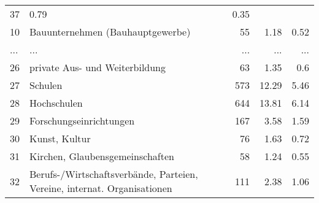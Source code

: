 \begin{longtable}{lXrrr}
          \num{37} &
          \num[round-mode=places,round-precision=2]{0,79} &
          \num[round-mode=places,round-precision=2]{0,35} \\
        10 & \multicolumn{1}{X}{Bauunternehmen (Bauhauptgewerbe)} & %
          \num{55} &
          \num[round-mode=places,round-precision=2]{1,18} &
          \num[round-mode=places,round-precision=2]{0,52} \\
       ... & ... & ... & ... & ... \\
        26 & \multicolumn{1}{X}{private Aus- und Weiterbildung} & %
          \num{63} &
          \num[round-mode=places,round-precision=2]{1,35} &
          \num[round-mode=places,round-precision=2]{0,6} \\

        27 & \multicolumn{1}{X}{Schulen} & %
          \num{573} &
          \num[round-mode=places,round-precision=2]{12,29} &
          \num[round-mode=places,round-precision=2]{5,46} \\

        28 & \multicolumn{1}{X}{Hochschulen} & %
          \num{644} &
          \num[round-mode=places,round-precision=2]{13,81} &
          \num[round-mode=places,round-precision=2]{6,14} \\

        29 & \multicolumn{1}{X}{Forschungseinrichtungen} & %
          \num{167} &
          \num[round-mode=places,round-precision=2]{3,58} &
          \num[round-mode=places,round-precision=2]{1,59} \\

        30 & \multicolumn{1}{X}{Kunst, Kultur} & %
          \num{76} &
          \num[round-mode=places,round-precision=2]{1,63} &
          \num[round-mode=places,round-precision=2]{0,72} \\

        31 & \multicolumn{1}{X}{Kirchen, Glaubensgemeinschaften} & %
          \num{58} &
          \num[round-mode=places,round-precision=2]{1,24} &
          \num[round-mode=places,round-precision=2]{0,55} \\

        32 & \multicolumn{1}{X}{Berufs-/Wirtschaftsverbände, Parteien, Vereine, internat. Organisationen} & %
          \num{111} &
          \num[round-mode=places,round-precision=2]{2,38} &
          \num[round-mode=places,round-precision=2]{1,06} \\


\end{longtable}
